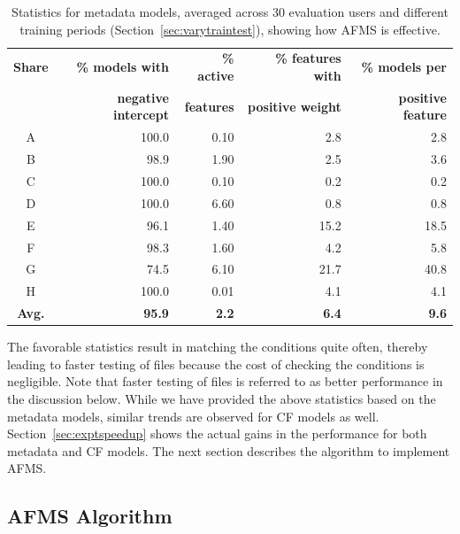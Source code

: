 \begin{table}
{\fontsize{8pt}{1em}\selectfont
\begin{center}
\begin{tabular}{|c|r|r|r|r|}
  \hline

\textbf{Share} & \textbf{\% models with} & \textbf{\% active} &
\textbf{\% features with} & \textbf{\% models per} \tabularnewline
& \textbf{negative intercept} & \textbf{features} & \textbf{positive
weight} & \textbf{positive feature} \tabularnewline \hline

A & 100.0 & 0.10 & 2.8 & 2.8  \tabularnewline  \hline
B & 98.9 & 1.90 & 2.5 & 3.6   \tabularnewline  \hline
C & 100.0 & 0.10 & 0.2 & 0.2  \tabularnewline  \hline
D & 100.0 & 6.60 & 0.8 & 0.8  \tabularnewline  \hline
E & 96.1 & 1.40 & 15.2 & 18.5 \tabularnewline  \hline
F & 98.3 & 1.60 & 4.2 & 5.8   \tabularnewline  \hline
G & 74.5 & 6.10 & 21.7 & 40.8 \tabularnewline  \hline
H & 100.0 & 0.01 & 4.1 & 4.1  \tabularnewline  \hline
\textbf{Avg.} & \textbf{95.9} & \textbf{2.2} & \textbf{6.4} & \textbf{9.6} \tabularnewline \hline
\end{tabular}
\end{center}
}
\vspace{-0.1in}
\caption{ Statistics for metadata models, averaged across 30 evaluation users and
  different training periods (Section~\ref{sec:varytraintest}), showing how
  AFMS is effective.}
\label{tab:SpeedupPotentialStats}
\end{table}
The favorable statistics result in matching the conditions quite
often, thereby leading to faster testing of files because the cost of
checking the conditions is negligible. Note that faster testing of files is 
referred to as better performance in the discussion below. 
While we have provided the above 
statistics based on the metadata models, similar trends are observed for CF models 
as well. 
Section~\ref{sec:exptspeedup}
shows the actual gains in the performance for both metadata and CF models.  The next section describes
the algorithm to implement AFMS.

\subsection{AFMS Algorithm}
\label{sec:AFMSAlgorithm}


